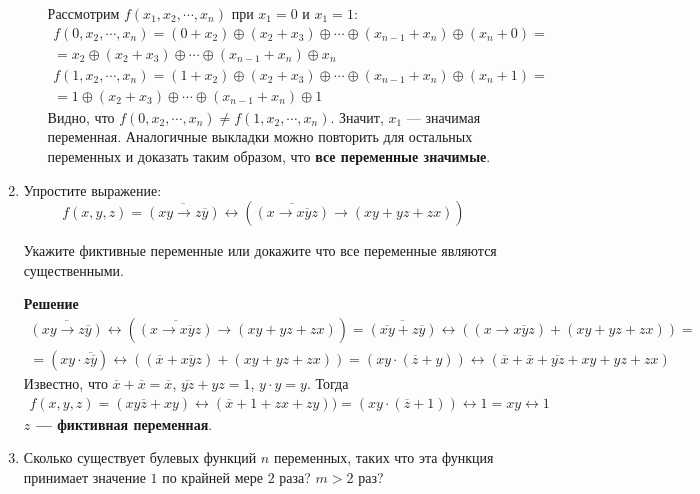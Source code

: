 \documentclass[12pt]{article}
\begin{document}
\begin{enumerate}[label={\textbf{\arabic{section}.\arabic*}}]
\begin{enumerate}[label=\textbf{\alph*)}]
			Рассмотрим $f(x_1, x_2, \cdots , x_n)$ при $x_1 = 0$ и $x_1 = 1$:
			\begin{multline*}
				f(0,x_2,\cdots,x_n)=(0+x_2)\oplus(x_2+x_3)\oplus\cdots\oplus(x_{n-1}+x_n)\oplus(x_n+0) = \\
				= x_2 \oplus (x_2+x_3) \oplus \cdots \oplus (x_{n-1}+x_n) \oplus x_n
			\end{multline*}
			\begin{multline*}
				f(1,x_2,\cdots,x_n)=(1+x_2)\oplus(x_2+x_3)\oplus\cdots\oplus(x_{n-1}+x_n)\oplus(x_n+1) = \\
				= 1 \oplus (x_2+x_3) \oplus \cdots \oplus (x_{n-1}+x_n) \oplus 1
			\end{multline*}
			Видно, что $f(0, x_2, \cdots , x_n) \neq f(1, x_2, \cdots , x_n)$. Значит, $x_1$ --- значимая переменная. Аналогичные выкладки можно повторить для остальных переменных и доказать таким образом, что \textbf{все переменные значимые}.
		\end{enumerate}
		\item Упростите выражение:
		$$
		f(x,y,z) = \overline{(xy\rightarrow z\overline{y})} \leftrightarrow \left(\overline{(x\rightarrow \overline{xyz})}\rightarrow{(xy+yz+zx)}\right)
		$$
		
		Укажите фиктивные переменные или докажите что все переменные являются существенными.
		
		\textbf{Решение}
		\begin{multline*}
			\overline{(xy\rightarrow z\overline{y})} \leftrightarrow \left(\overline{(x\rightarrow \overline{xyz})}\rightarrow{(xy+yz+zx)}\right) = \overline{(\overline{xy}+z\overline{y})} \leftrightarrow \left((x \rightarrow \overline{xyz}) + (xy+yz+zx)\right) =\\
			= (xy \cdot \overline{z\overline{y}}) \leftrightarrow \left((\overline{x} + \overline{xyz}) + (xy+yz+zx)\right) = (xy\cdot(\overline{z}+y)) \leftrightarrow (\overline{x} + \overline{x} +\overline{yz} + xy + yz + zx) 		
		\end{multline*}
		Известно, что $\overline{x} + \overline{x} = \overline{x}$, $\overline{yz} + yz = 1$, $y \cdot y = y$. Тогда
		\begin{multline*}
			f(x,y,z) = (xy\overline{z} + xy) \leftrightarrow (\overline{x} + 1 + zx + zy)) = (xy \cdot (\overline{z} + 1)) \leftrightarrow 1 =	xy \leftrightarrow 1
		\end{multline*}
		\textbf{$z$ --- фиктивная переменная}.
		\item Сколько существует булевых функций $n$ переменных, таких что эта функция принимает значение $1$ по крайней мере $2$ раза? $m>2$ раз?
		

\end{enumerate}
\end{document}
